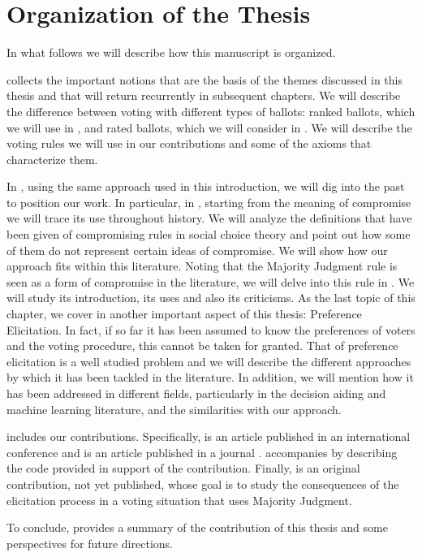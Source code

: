 \section{Organization of the Thesis}

In what follows we will describe how this manuscript is organized. 

 collects the important notions that are the basis of the themes discussed in this thesis and that will return recurrently in subsequent chapters. We will describe the difference between voting with different types of ballots: ranked ballots, which we will use in , and rated ballots, which we will consider in . We will describe the voting rules we will use in our contributions and some of the axioms that characterize them.

In , using the same approach used in this introduction, we will dig into the past to position our work. In particular, in , starting from the meaning of compromise we will trace its use throughout history. We will analyze the definitions that have been given of compromising rules in social choice theory and point out how some of them do not represent certain ideas of compromise. We will show how our approach fits within this literature. 
Noting that the Majority Judgment rule is seen as a form of compromise in the literature, we will delve into this rule in . We will study its introduction, its uses and also its criticisms.
As the last topic of this chapter, we cover in  another important aspect of this thesis: Preference Elicitation. In fact, if so far it has been assumed to know the preferences of voters and the voting procedure, this cannot be taken for granted. That of preference elicitation is a well studied problem and we will describe the different approaches by which it has been tackled in the literature. In addition, we will mention how it has been addressed in different fields, particularly in the decision aiding and machine learning literature, and the similarities with our approach.

 includes our contributions. Specifically,  is an article published in an international conference \citep{Napolitano2021} and  is an article published in a journal \citep{Cailloux2022}.  accompanies  by describing the code provided in support of the contribution. 
Finally,  is an original contribution, not yet published, whose goal is to study the consequences of the elicitation process in a voting situation that uses Majority Judgment.

To conclude,  provides a summary of the contribution of this thesis and some perspectives for future directions.
